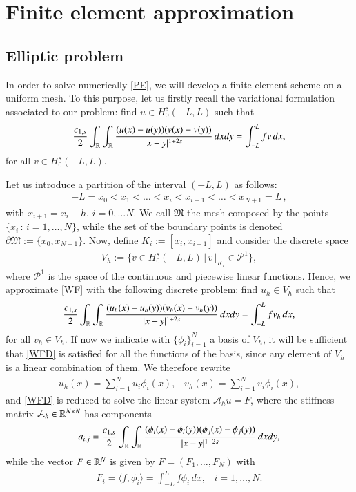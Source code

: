 \section{Finite element approximation}\label{fe_sec}

\subsection{Elliptic problem}\label{fe_ell_sec}

In order to solve numerically \eqref{PE}, we will develop a finite element scheme on a uniform mesh. To this purpose, let us firstly recall the variational formulation associated to our problem: find $u\in H_0^s(-L,L)$ such that
\begin{align}\label{WF}
	\frac{c_{1,s}}{2} \int_{\mathbb{R}}\int_{\mathbb{R}}\frac{(u(x)-u(y))(v(x)-v(y))}{|x-y|^{1+2s}}\,dxdy = \int_{-L}^L fv\,dx,	
\end{align}
for all $v\in H_0^s(-L,L)$. 

Let us introduce a partition of the interval $(-L,L)$ as follows:
\begin{align*}
	-L = x_0<x_1<\ldots <x_i<x_{i+1}<\ldots<x_{N+1}=L\,,
\end{align*}
with $x_{i+1}=x_i+h$, $i=0,\ldots N$. We call $\mathfrak{M}$ the mesh composed by the points $\{x_i\,:\, i=1,\ldots,N\}$, while the set of the boundary points is denoted $\partial\mathfrak{M}:=\{x_0,x_{N+1}\}$. Now, define $K_i:=[x_i,x_{i+1}]$ and consider the discrete space 
\begin{align*}
	V_h :=\Big\{v\in H_0^s(-L,L)\,\big|\, \left. v\,\right|_{K_i}\in \mathcal{P}^1\Big\},
\end{align*} 
where $\mathcal{P}^1$ is the space of the continuous and piecewise linear functions. Hence, we approximate \eqref{WF} with the following discrete problem: find $u_h\in V_h$ such that
\begin{align}\label{WFD}
	\frac{c_{1,s}}{2} \int_{\mathbb{R}}\int_{\mathbb{R}}\frac{(u_h(x)-u_h(y))(v_h(x)-v_h(y))}{|x-y|^{1+2s}}\,dxdy = \int_{-L}^L fv_h\,dx,	
\end{align}
for all $v_h\in V_h$. If now we indicate with $\big\{\phi_i\big\}_{i=1}^N$ a basis of $V_h$, it will be sufficient that \eqref{WFD} is satisfied for all the functions of the basis, since any element of $V_h$ is a linear combination of them. We therefore rewrite 
\begin{align*}
	u_h(x) = \sum_{i=1}^N u_i\phi_i(x),\;\;\; v_h(x) = \sum_{i=1}^N v_i\phi_i(x),
\end{align*} 
and \eqref{WFD} is reduced to solve the linear system $\mathcal A_h u=F$, where the stiffness matrix $\mathcal A_h\in \mathbb{R}^{N\times N}$ has components
\begin{align}\label{stiffness}
	a_{i,j}=\frac{c_{1,s}}{2} \int_{\mathbb{R}}\int_{\mathbb{R}}\frac{(\phi_i(x)-\phi_i(y))(\phi_j(x)-\phi_j(y))}{|x-y|^{1+2s}}\,dxdy,	
\end{align}
while the vector $F\in\mathbb{R}^N$ is given by $F=(F_1,\ldots,F_N)$ with
\begin{align*}
	F_i = \langle f,\phi_i\rangle = \int_{-L}^L f\phi_i\,dx,\;\;\; i=1,\ldots,N.
\end{align*}


